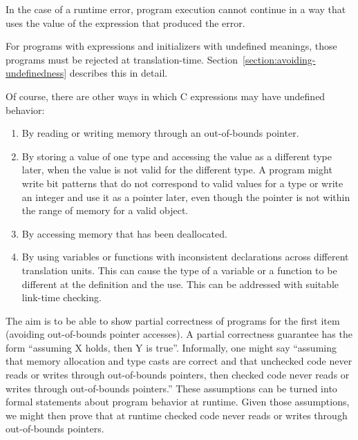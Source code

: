 In the case of a runtime error, program execution cannot continue in a
way that uses the value of the expression that produced the error.

For programs with expressions and initializers with undefined meanings,
those programs must be rejected at translation-time.
Section~\ref{section:avoiding-undefinedness}
describes this in detail.

Of course, there are other ways in which C expressions may have
undefined behavior:

\begin{enumerate}
\item
  By reading or writing memory through an out-of-bounds pointer.
\item
  By storing a value of one type and accessing the value as a different
  type later, when the value is not valid for the different type. A
  program might write bit patterns that do not correspond to valid
  values for a type or write an integer and use it as a pointer later,
  even though the pointer is not within the range of memory for a valid
  object.
\item
  By accessing memory that has been deallocated.
\item
  By using variables or functions with inconsistent declarations across
  different translation units. This can cause the type of a variable or
  a function to be different at the definition and the use. This can be
  addressed with suitable link-time checking.
\end{enumerate}

The aim is to be able to show partial correctness of programs for the
first item (avoiding out-of-bounds pointer accesses). A
partial correctness guarantee has the form ``assuming X holds, then Y is
true''. Informally, one might say ``assuming that memory allocation and
type casts are correct and that unchecked code never reads or writes through
out-of-bounds pointers, then checked code never reads or writes through
out-of-bounds pointers.'' These assumptions can be turned into formal
statements about program behavior at runtime. Given those assumptions,
we might then prove that at runtime checked code never reads or writes
through out-of-bounds pointers.
